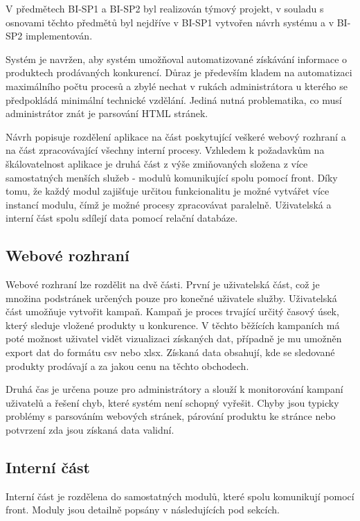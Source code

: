 \documentclass[thesis=B,czech]{FITthesis}[2012/06/26]
\begin{document}
V předmětech BI-SP1 a BI-SP2 byl realizován týmový projekt, v souladu s osnovami těchto předmětů byl nejdříve v BI-SP1 vytvořen návrh
systému a v BI-SP2 implementován.
\par
Systém je navržen, aby systém umožňoval automatizované získávání informace o produktech prodávaných konkurencí. Důraz je především kladem
na automatizaci maximálního počtu procesů a zbylé nechat v rukách administrátora u kterého se předpokládá minimální technické vzdělání.
Jediná nutná problematika, co musí administrátor znát je parsování HTML stránek.
\par
Návrh popisuje rozdělení aplikace na část poskytující veškeré webový rozhraní a na část zpracovávající všechny interní procesy.
Vzhledem k požadavkům na škálovatelnost aplikace je druhá část z výše zmiňovaných složena z více samostatných menších služeb - modulů komunikující
spolu pomocí front. Díky tomu, že každý modul zajišťuje určitou funkcionalitu je možné vytvářet více instancí modulu, čímž je možné
procesy zpracovávat paralelně. 
Uživatelská a interní část spolu sdílejí data pomocí relační databáze\cite{DB}.
\par
\subsection{Webové rozhraní}
Webové rozhraní lze rozdělit na dvě části. První je uživatelská část, což je množina podstránek určených pouze pro konečné uživatele
služby. Uživatelská část umožňuje vytvořit kampaň. Kampaň je proces trvající určitý časový úsek, který sleduje vložené produkty u konkurence.
V těchto běžících kampaních má poté možnost uživatel vidět vizualizaci získaných dat, případně je mu umožněn export dat do formátu
csv nebo xlsx. Získaná data obsahují, kde se sledované produkty prodávají a za jakou cenu na těchto obchodech.
\par
Druhá čas je určena pouze pro administrátory a slouží k monitorování kampaní uživatelů a řešení chyb, které systém není schopný vyřešit.
Chyby jsou typicky problémy s parsováním webových stránek, párování produktu ke stránce nebo potvrzení zda jsou získaná data validní.
\subsection{Interní část}
Interní část je rozdělena do samostatných modulů, které spolu komunikují pomocí front. Moduly jsou detailně popsány v následujících pod sekcích.
\end{document}
